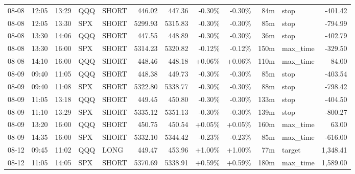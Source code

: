 \documentclass[11pt,a4paper,twoside]{article}
\begin{document}
\begin{center}
\begin{longtable}{>{\color{txtmain}}l l l l l r r r r r >{\color{txtmain}}l r}
08-08 & 12:05 & 13:29 & QQQ & SHORT & 446.02 & 447.36 & \textcolor{lossred}{-0.30\%} & \textcolor{lossred}{-0.30\%} & 84m & stop & \textcolor{lossred}{-401.42} \\
08-08 & 12:05 & 13:30 & SPX & SHORT & 5299.93 & 5315.83 & \textcolor{lossred}{-0.30\%} & \textcolor{lossred}{-0.30\%} & 85m & stop & \textcolor{lossred}{-794.99} \\
08-08 & 13:30 & 14:06 & QQQ & SHORT & 447.55 & 448.89 & \textcolor{lossred}{-0.30\%} & \textcolor{lossred}{-0.30\%} & 36m & stop & \textcolor{lossred}{-402.79} \\
08-08 & 13:30 & 16:00 & SPX & SHORT & 5314.23 & 5320.82 & \textcolor{lossred}{-0.12\%} & \textcolor{lossred}{-0.12\%} & 150m & max\_time & \textcolor{lossred}{-329.50} \\
08-08 & 14:10 & 16:00 & QQQ & SHORT & 448.46 & 448.18 & \textcolor{wingreen}{+0.06\%} & \textcolor{wingreen}{+0.06\%} & 110m & max\_time & \textcolor{wingreen}{84.00} \\
08-09 & 09:40 & 11:05 & QQQ & SHORT & 448.38 & 449.73 & \textcolor{lossred}{-0.30\%} & \textcolor{lossred}{-0.30\%} & 85m & stop & \textcolor{lossred}{-403.54} \\
08-09 & 09:40 & 11:08 & SPX & SHORT & 5322.80 & 5338.77 & \textcolor{lossred}{-0.30\%} & \textcolor{lossred}{-0.30\%} & 88m & stop & \textcolor{lossred}{-798.42} \\
08-09 & 11:05 & 13:18 & QQQ & SHORT & 449.45 & 450.80 & \textcolor{lossred}{-0.30\%} & \textcolor{lossred}{-0.30\%} & 133m & stop & \textcolor{lossred}{-404.50} \\
08-09 & 11:10 & 13:29 & SPX & SHORT & 5335.12 & 5351.13 & \textcolor{lossred}{-0.30\%} & \textcolor{lossred}{-0.30\%} & 139m & stop & \textcolor{lossred}{-800.27} \\
08-09 & 13:20 & 16:00 & QQQ & SHORT & 450.75 & 450.54 & \textcolor{wingreen}{+0.05\%} & \textcolor{wingreen}{+0.05\%} & 160m & max\_time & \textcolor{wingreen}{63.00} \\
08-09 & 14:35 & 16:00 & SPX & SHORT & 5332.10 & 5344.42 & \textcolor{lossred}{-0.23\%} & \textcolor{lossred}{-0.23\%} & 85m & max\_time & \textcolor{lossred}{-616.00} \\
08-12 & 09:45 & 11:02 & QQQ & LONG & 449.47 & 453.96 & \textcolor{wingreen}{+1.00\%} & \textcolor{wingreen}{+1.00\%} & 77m & target & \textcolor{wingreen}{1,348.41} \\
08-12 & 11:05 & 14:05 & SPX & SHORT & 5370.69 & 5338.91 & \textcolor{wingreen}{+0.59\%} & \textcolor{wingreen}{+0.59\%} & 180m & max\_time & \textcolor{wingreen}{1,589.00} \\

\end{longtable}
\end{center}
\end{document}
